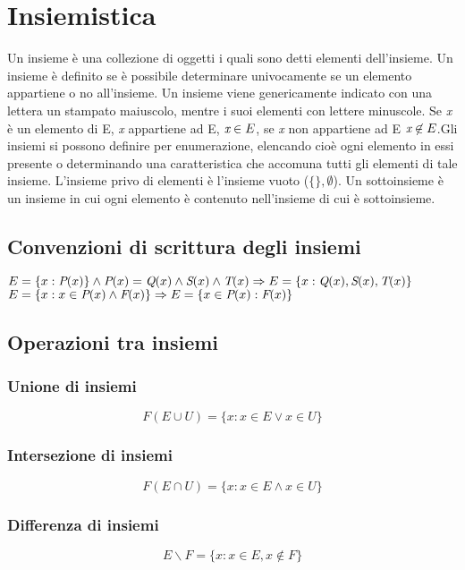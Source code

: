 \chapter{Insiemistica}
Un insieme \`e una collezione di oggetti i quali sono detti elementi dell'insieme. Un insieme \`e definito se \`e possibile determinare univocamente se un elemento appartiene o no all'insieme. Un insieme viene genericamente indicato con una lettera un stampato maiuscolo, mentre i suoi elementi con lettere minuscole. Se \emph{x} \`e un elemento di E, \emph{x} appartiene ad E, $\emph{x} \in E$, se \emph{x} non appartiene ad E  $\emph{x} \not\in E$.Gli insiemi si possono definire per enumerazione, elencando cio\`e ogni elemento in essi presente o determinando una caratteristica che accomuna tutti gli elementi di tale insieme. L'insieme privo di elementi \`e l'insieme vuoto ($\{\},\emptyset$). Un sottoinsieme \`e un insieme in cui ogni elemento \`e contenuto nell'insieme di cui \`e sottoinsieme. 
\section{Convenzioni di scrittura degli insiemi}
\begin{center}
$E=\{x:\emph{P}(x)\} \wedge \emph{P}(x) = \emph{Q}(x)\wedge\emph{S}(x)\wedge\emph{T}(x) \Rightarrow E=\{x:\emph{Q}(x),\emph{S}(x),\emph{T}(x)\}$\\
$E=\{x:x \in \emph{P}(x)\wedge\emph{F}(x)\} \Rightarrow  E=\{x\in\emph{P}(x):\emph{F}(x)\}$\\
\end{center}
\section{Operazioni tra insiemi}
\subsection{Unione di insiemi}
\begin{equation}
F(E \cup U) = \{ x: x\in E\lor x\in U\}
\end{equation}

\subsection{Intersezione di insiemi}
\begin{equation}
F(E \cap U) = \{ x: x\in E\wedge x\in U\}
\end{equation}

\subsection{Differenza di insiemi}
\begin{equation}
E \backslash F =\{x:x\in E, x\not\in F\}
\end{equation}


